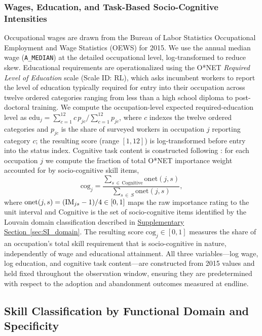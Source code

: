 \documentclass[11pt, letterpaper]{article} %
\newcommand{\textcite}[1]{\cite{#1}}
\begin{document}
\subsubsection{Wages, Education, and Task-Based Socio-Cognitive Intensities}
\label{sec:SI_wages}
 
Occupational wages are drawn from the Bureau of Labor Statistics Occupational Employment and Wage Statistics (OEWS) for 2015. We use the annual median wage (\texttt{A\_MEDIAN}) at the detailed occupational level, log-transformed to reduce skew. Educational requirements are operationalized using the O*NET \emph{Required Level of Education} scale (Scale ID: RL), which asks incumbent workers to report the level of education typically required for entry into their occupation across twelve ordered categories ranging from less than a high school diploma to post-doctoral training. We compute the occupation-level expected required-education level as $\mathrm{edu}_j = \sum_{c=1}^{12} c\,p_{jc} \big/ \sum_{c=1}^{12} p_{jc}$, where $c$ indexes the twelve ordered categories and $p_{jc}$ is the share of surveyed workers in occupation $j$ reporting category $c$; the resulting score (range $[1,12]$) is log-transformed before entry into the status index. Cognitive task content is constructed following \textcite{alabdulkareem_unpacking_2018}: for each occupation $j$ we compute the fraction of total O*NET importance weight accounted for by socio-cognitive skill items,
%
\begin{equation*}
\mathrm{cog}_j = \frac{\displaystyle\sum_{s \,\in\, \text{Cognitive}} \mathrm{onet}(j,s)}{\displaystyle\sum_{s \,\in\, S} \mathrm{onet}(j,s)},
\end{equation*}
%
where $\mathrm{onet}(j,s) = ({\rm IM}_{js} - 1)/4 \in [0,1]$ maps the raw importance rating to the unit interval and $\text{Cognitive}$ is the set of socio-cognitive items identified by the Louvain domain classification described in \hyperref[sec:SI_domain]{Supplementary Section~\ref*{sec:SI_domain}}. The resulting score $\mathrm{cog}_j \in [0,1]$ measures the share of an occupation's total skill requirement that is socio-cognitive in nature, independently of wage and educational attainment. All three variables---log wage, log education, and cognitive task content---are constructed from 2015 values and held fixed throughout the observation window, ensuring they are predetermined with respect to the adoption and abandonment outcomes measured at endline.
 
 \subsection{Skill Classification by Functional Domain and Specificity}
\label{sec:SI_skill_class}
 
\end{document}
